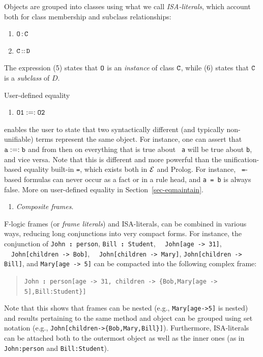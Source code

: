 \documentclass[11pt]{article}
\newcommand{\ERGO}{\mbox{\ensuremath{\cal{E}}\smaller{{\sc{RGO}}}}\xspace}
\newcommand{\FLSYSTEM}{\ERGO}
\newcommand{\isa}{\,{\bf{:}}\,}
\newcommand{\subcl}{\,{\bf{::}}\,}
\newcommand{\mvd}{{\mbox{\tt \,->\,}}}  %
\begin{document}
\begin{itemize}
  \medskip

  Objects are grouped into classes using what we call
  \emph{ISA-literals}, which account both for class membership and subclass
  relationships:

  \medskip

  \begin{enumerate}
  \item[5.] $\tt O\isa C$
  \item[6.] \label{eq-subclass} $\tt C\subcl D$
  \end{enumerate}

  The expression (5) states that $\tt O$ is an \emph{instance} of class $\tt C$,
  while (6) states that $\tt C$ is a \emph{subclass} of $D$.

  User-defined equality
  \begin{enumerate}
    \item[7.] $\tt O1 :=: O2$
  \end{enumerate}
  enables the user to state that two syntactically different (and typically
  non-unifiable) terms represent the same object. For instance, one can
  assert that $\tt a :=: b$ and from then on everything that is true about {\tt
  a}  will be true about {\tt b}, and vice versa. Note that this is
  different and more powerful than the unification-based equality built-in
  {\tt =}, which exists both in \FLSYSTEM and Prolog. For instance, {\tt
  =}-based formulas can never occur as a fact or in a rule head, and {\tt a =
  b} is always false.  More on user-defined equality in
  Section~\ref{sec-eqmaintain}.

  \begin{enumerate}
   \item[8.] \emph{Composite frames}.  
  \end{enumerate}
  F-logic frames (or \emph{frame literals}) and
  ISA-literals, can be combined in various ways, reducing long conjunctions
  into very compact forms.
  For instance, the conjunction of
  {\tt John{\isa}person}, \texttt{Bill{\isa}Student},~~ {\tt John[age{\mvd}31]},
  ~~{\tt John[children\mvd Bob]},
  ~~\texttt{John[children\mvd Mary]},
  \texttt{John[children\mvd Bill]}, and \texttt{Mary[age\mvd 5]}  
  can be compacted into the following complex frame:
  \begin{quote}
    {\tt John{\isa}person[age{\mvd}31, children\mvd\{Bob,Mary[age\mvd
      5],Bill:Student\}]} 
  \end{quote}
  Note that this shows that frames can be nested (e.g.,
  \texttt{Mary[age->5]} is nested) and results pertaining to
  the same method and object
  can be grouped using set notation (e.g.,
  \texttt{John[children->\{Bob,Mary,Bill\}]}). Furthermore, ISA-literals
  can be attached both to the outermost object as well as the inner ones
  (as in \texttt{John:person} and \texttt{Bill:Student}).  


\end{itemize}
\end{document}
